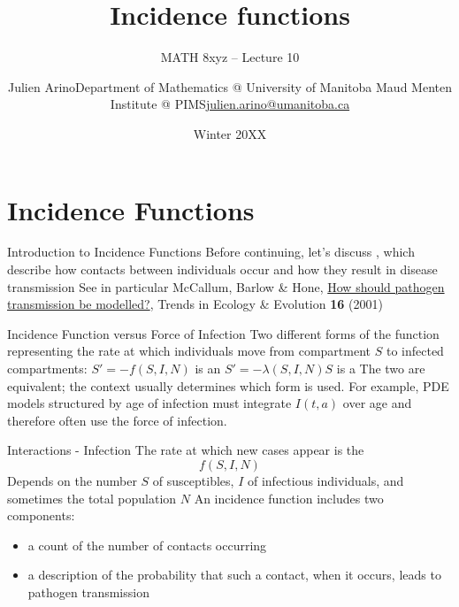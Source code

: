 \documentclass[aspectratio=169]{beamer}\usepackage[]{graphicx}\usepackage[]{xcolor}
\title{Incidence functions}
\subtitle{MATH 8xyz -- Lecture 10}
\author{\texorpdfstring{Julien Arino\newline Department of Mathematics @ University of Manitoba \newline Maud Menten Institute @ PIMS\newline\url{julien.arino@umanitoba.ca}}{Julien Arino}}
\date{Winter 20XX}
\begin{document}


\section{Incidence Functions}

\begin{frame}{Introduction to Incidence Functions}
\bbullet Before continuing, let's discuss , which describe how contacts between individuals occur and how they result in disease transmission
\vfill
\bbullet See in particular McCallum, Barlow \& Hone, \href{https://doi.org/10.1016/S0169-5347(01)02144-9}{How should pathogen transmission be modelled?}, Trends in Ecology \& Evolution \textbf{16} (2001)
\nocite{mccallum2001should}
\end{frame}

\begin{frame}{Incidence Function versus Force of Infection}
\bbullet Two different forms of the function representing the rate at which individuals move from compartment $S$ to infected compartments:
\vfill
\bbullet $S'=-f(S,I,N)$ is an 
\vfill
\bbullet $S'=-\lambda(S,I,N)S$ is a 
\vfill
\bbullet The two are equivalent; the context usually determines which form is used. For example, PDE models structured by age of infection must integrate $I(t,a)$ over age and therefore often use the force of infection.
\end{frame}

\begin{frame}{Interactions - Infection}
\bbullet The rate at which new cases appear is the 
\begin{equation}
\tag{1}
f(S,I,N)
\end{equation}
\bbullet Depends on the number $S$ of susceptibles, $I$ of infectious individuals, and sometimes the total population $N$
\vfill
\bbullet An incidence function includes two components:
\begin{itemize}
  \item a count of the number of contacts occurring
  \item a description of the probability that such a contact, when it occurs, leads to pathogen transmission
\end{itemize}
\end{frame}
\end{document}
